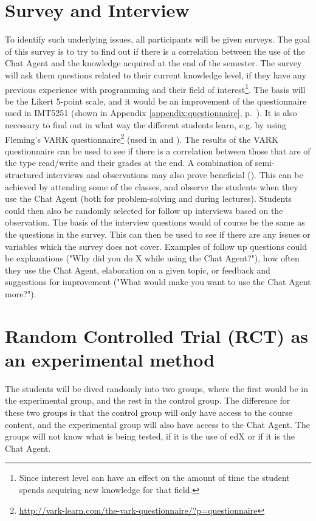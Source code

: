 \section{Survey and Interview}
\label{chapter4:survey_and_interview}
To identify such underlying issues, all participants will be given surveys. The goal of this survey is to try to find out if there is a correlation between the use of the 
Chat Agent and the knowledge acquired at the end of the semester. The survey will ask them questions related to their current knowledge level, if they have any previous 
experience with programming and their field of interest\footnote{Since interest level can have an effect on the amount of time the student spends acquiring new knowledge 
	for that field.}. The basis will be the Likert 5-point scale, and it would be an improvement of the questionnaire used in IMT5251 (shown in Appendix \ref{appendix:questionnaire}, 
p.~\pageref{appendix:questionnaire}). It is also necessary to find out in what way the different students learn, e.g. by using Fleming's VARK 
 questionnaire\footnote{\url{http://vark-learn.com/the-vark-questionnaire/?p=questionnaire}} (used in \citet[p.~152]{Kowalski2013} and \citet{Sarabdeen2013}). 
The results of the VARK questionnaire can be used to see if there is a correlation between those that are of the type read/write and their grades at the end.
\newpage\noindent
A combination of semi-structured interviews and observations may also prove beneficial (\citet{Fincher2011}). This can be achieved by attending some of the classes, and 
observe the students when they use the Chat Agent (both for problem-solving and during lectures). Students could then also be randomly selected for follow up interviews 
based on the observation. The basis of the interview questions would of course be the same as the questions in the survey. This can then be used to see if there are any 
issues or variables which the survey does not cover. Examples of follow up questions could be explanations ("Why did you do X while using the Chat Agent?"), how often 
they use the Chat Agent, elaboration on a given topic, or feedback and suggestions for improvement ("What would make you want to use the Chat Agent more?"). 

\section{Random Controlled Trial (RCT) as an experimental method}
\label{chapter4:rtc}
The students will be dived randomly into two groups, where the first would be in the experimental group, and the rest in the control group. The difference for these two 
groups is that the control group will only have access to the course content, and the experimental group will also have access to the Chat Agent. The groups will not know 
what is being tested, if it is the use of edX or if it is the Chat Agent.

